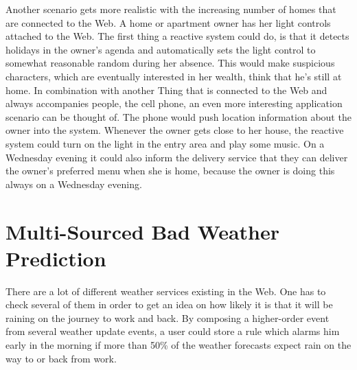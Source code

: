 Another scenario gets more realistic with the increasing number of homes that are connected to the Web.
A home or apartment owner has her light controls attached to the Web.
The first thing a reactive system could do, is that it detects holidays in the owner's agenda and automatically sets the light control to somewhat reasonable random during her absence.
This would make suspicious characters, which are eventually interested in her wealth, think that he's still at home.
In combination with another \textrm{Thing} that is connected to the Web and always accompanies people, the cell phone, an even more interesting application scenario can be thought of.
The phone would push location information about the owner into the system.
Whenever the owner gets close to her house, the reactive system could turn on the light in the entry area and play some music.
On a Wednesday evening it could also inform the delivery service that they can deliver the owner's preferred menu when she is home, because the owner is doing this always on a Wednesday evening.




\section{Multi-Sourced Bad Weather Prediction}
There are a lot of different weather services existing in the Web.
One has to check several of them in order to get an idea on how likely it is that it will be raining on the journey to work and back.
By composing a higher-order event from several weather update events, a user could store a rule which alarms him early in the morning if more than 50\% of the weather forecasts expect rain on the way to or back from work.
